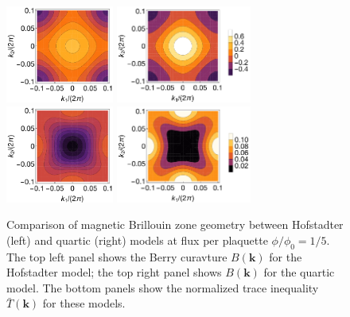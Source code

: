 \documentclass[aps,prb,twocolumn,letterpaper,twoside,nobalancelastpage,groupedaddress,amsmath,amssymb,floatfix,citeautoscript]{revtex4-1}
\begin{document}

\begin{figure}[thb]
\centering
\includegraphics[width=1.4in]{curv-hof-n5.pdf}
\includegraphics[width=1.75in]{curv-qrt-n5.pdf}
\includegraphics[width=1.4in]{norm-tr-hof-n5.pdf}
\includegraphics[width=1.75in]{norm-tr-qrt-n5.pdf}
\caption{Comparison of magnetic Brillouin zone geometry between Hofstadter (left) and quartic (right) models at flux per plaquette $\phi/\phi_0=1/5$. The top left panel shows the Berry curavture $B(\mathbf{k})$ for the Hofstadter model; the top right panel shows $B(\mathbf{k})$ for the quartic model. The bottom panels show the normalized trace inequality $\bar{T}(\mathbf{k})$ for these models.}
\end{figure}
\end{document}
